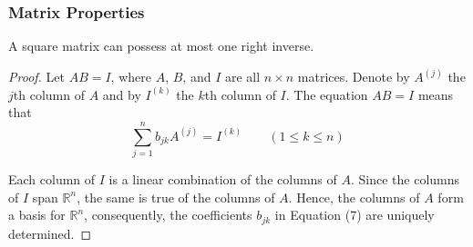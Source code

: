 \documentclass[notheorems,mathserif,table,compress]{beamer}  %
\begin{document}
\begin{frame}
\frametitle{Matrix Properties}
\begin{theorem}
A square matrix can possess at most one right inverse.
\end{theorem}
\begin{proof}
Let $AB=I$, where $A$, $B$, and $I$ are all $n\times n$ matrices. Denote by $A^{(j)}$ the $j$th column of $A$ and by $I^{(k)}$ the $k$th column of $I$. The equation $AB=I$ means that 
\begin{equation}
\sum_{j=1}^{n}b_{jk}A^{(j)}=I^{(k)} \qquad (1\leq k\leq n)
\end{equation}

Each column of $I$ is a linear combination of the columns of $A$. Since the columns of $I$ span $\mathbb{R}^n$, the same is true of the columns of $A$. Hence, the columns of $A$ form a basis for $\mathbb{R}^n$, consequently, the coefficients $b_{jk}$ in Equation (7) are uniquely determined. 
\end{proof}
\end{frame}
\end{document}
